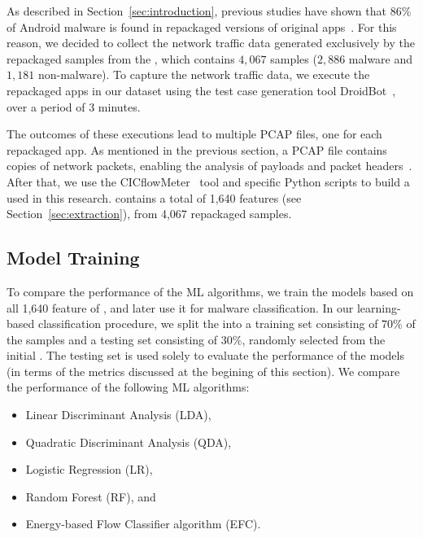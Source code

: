As described in Section~\ref{sec:introduction}, previous studies have shown that $86\%$ of Android malware is found in repackaged
versions of original apps~\cite{DBLP:journals/tdsc/TianYRTP20,DBLP:conf/sp/ZhouJ12}. For this reason, we decided to collect the network traffic
data generated exclusively by the repackaged samples from the \cds, which contains $4,067$ samples ($2,886$ malware and $1,181$ non-malware).
To capture the network traffic data, we execute the repackaged apps in our dataset using the test case generation tool
DroidBot~\cite{DBLP:conf/icse/LiYGC17}, over a period of $3$ minutes.

The outcomes of these executions lead to multiple PCAP files, one for each repackaged app. As mentioned in the previous
section, a PCAP file contains copies of network packets, enabling the analysis of payloads and packet headers~\cite{DBLP:conf/iv/UhlarHR21}.
After that, we use the CICflowMeter~\cite{DBLP:conf/icissp/LashkariDMG17} tool and specific Python scripts to build a
\fds used in this research. \fds contains a total of 1,640 features (see Section~\ref{sec:extraction}), from 4,067 repackaged samples.

\subsection{Model Training}\label{sec:training}

To compare the performance of the ML algorithms, we train the
models based on all 1,640 feature of \fds, and later use it for malware classification. In our learning-based classification procedure,
we split the \fds into a training set consisting of $70\%$
of the samples and a testing set consisting of $30\%$, randomly
selected from the initial \fds. The testing set is used solely
to evaluate the performance of the models (in terms of the metrics
discussed at the begining of this section).
We compare the performance of the following ML algorithms:


\begin{itemize}
  \item Linear Discriminant Analysis (LDA),
  \item Quadratic Discriminant Analysis (QDA),
  \item Logistic Regression (LR),
  \item Random Forest (RF), and
  \item Energy-based Flow Classifier algorithm (EFC).
\end{itemize}


